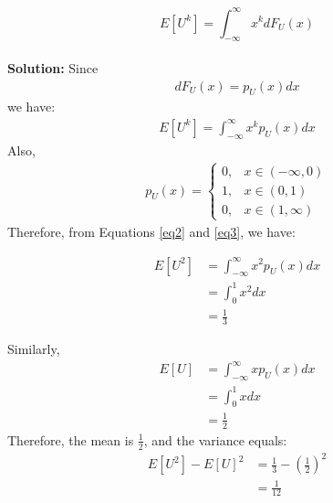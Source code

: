 \documentclass[journal,12pt,twocolumn]{IEEEtran}
\newcommand{\solution}{\noindent \textbf{Solution: }}
\providecommand{\brak}[1]{\ensuremath{\left(#1\right)}}
\providecommand{\sbrak}[1]{\ensuremath{\left[#1\right]}}
\numberwithin{equation}{section}
\begin{document}
%
\begin{equation}
E\sbrak{U^k} = \int_{-\infty}^{\infty}x^kdF_{U}(x)
\end{equation}
\\
\solution  Since 
\begin{align}
    dF_U(x) = p_U(x) dx
\end{align}
we have:
\begin{align}
    \label{eq2}
    E[U^k] = \int_{-\infty}^{\infty}x^k p_U(x) dx
\end{align}
Also,
\begin{align}
    \label{eq3}
     p_U(x) = 
    \begin{cases}
        0, & x \in (-\infty,0) \\
        1, & x \in (0,1) \\
        0, & x \in (1, \infty)
    \end{cases}
\end{align}
Therefore, from Equations \ref{eq2} and \ref{eq3}, we have:
    
    \begin{align}
        E[U^2] &=  \int_{-\infty}^{\infty}x^2 p_U(x) dx \\
        &= \int_0 ^1 x^2 dx \\
        &= \frac{1}{3}
    \end{align}
    
    Similarly, 
    \begin{align}
        E[U] &=  \int_{-\infty}^{\infty}x p_U(x) dx \\
        &= \int_0 ^1 x dx \\
        &= \frac{1}{2}
    \end{align}
    Therefore, the mean is $\frac{1}{2}$, and the variance equals:
    \begin{align}
        E[U^2] - E[U]^2 &= \frac{1}{3} - \brak{\frac{1}{2}}^2 \\
        &= \frac{1}{12}
    \end{align}
    
\end{document}
